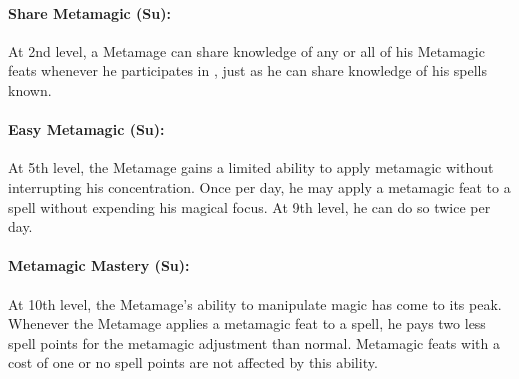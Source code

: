 \paragraph{Share Metamagic (Su):}
At 2nd level, a Metamage can share knowledge of any or all of his Metamagic feats whenever he participates in , just as he can share knowledge of his spells known.

\paragraph{Easy Metamagic (Su):}
At 5th level, the Metamage gains a limited ability to apply metamagic without interrupting his concentration.
Once per day, he may apply a metamagic feat to a spell without expending his magical focus.
At 9th level, he can do so twice per day.

\paragraph{Metamagic Mastery (Su):}
At 10th level, the Metamage's ability to manipulate magic has come to its peak.
Whenever the Metamage applies a metamagic feat to a spell, he pays two less spell points for the metamagic adjustment than normal.
Metamagic feats with a cost of one or no spell points are not affected by this ability.